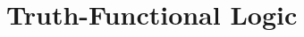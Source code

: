 \section{Truth-Functional Logic}



\newpage


\newpage


\newpage


\newpage


\newpage



\newpage


\newpage
